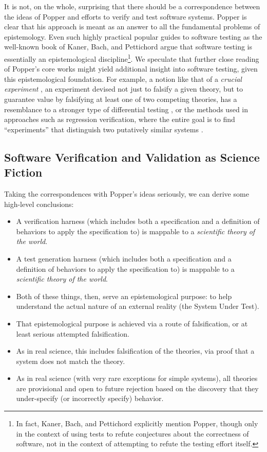 \documentclass{svjour3}
\begin{document}
It is not, on the whole, surprising that there should be a
correspondence between the ideas of Popper and efforts to verify
and test software systems.  Popper is clear that his approach is meant
as an answer to all the fundamental problems of epistemology.  Even
such highly practical popular guides to software testing as the
well-known book of Kaner, Bach, and Pettichord \cite{kaner} argue that
software testing is essentially an epistemological
discipline\footnote{In fact, Kaner, Bach, and Pettichord explicitly
  mention Popper, though only in the context of using tests to refute
  conjectures about the correctness of software, not in the context of
  attempting to refute the testing effort itself.}.  We speculate that
further close reading of Popper's core works might yield additional
insight into software testing, given this epistemological foundation.
For example, a notion like that of a \emph{crucial experiment}
\cite{Popper}, an experiment
devised not just to falsify a given theory, but to guarantee value by
falsifying at least one of two competing theories, has a resemblance
to a stronger type of differential testing \cite{Differential}, or the
methods used in approaches such as regression verification, where the
entire goal is to find ``experiments'' that distinguish two putatively
similar systems \cite{strichman2008regression}.

\subsection{Software Verification and Validation as Science Fiction}

Taking the correspondences with Popper's ideas seriously, we can derive
some high-level conclusions:

\begin{itemize}
\item A verification harness (which includes both a specification and a
  definition of behaviors to apply the specification to) is mappable
 to a \emph{scientific theory of the world}.
\item A test generation harness (which includes both a specification and a
  definition of behaviors to apply the specification to) is mappable
 to a \emph{scientific theory of the world}.
\item Both of these things, then, serve an epistemological purpose:
  to help understand the actual nature of an external reality (the
  System Under Test).
\item That epistemological purpose is achieved via a route of
  falsification, or at least serious attempted falsification.
\item As in real science, this includes falsification of the theories,
  via proof that a system does not match the theory.
\item As in real science (with very rare exceptions for simple
  systems), all theories are provisional and open to future rejection
  based on the discovery that they under-specify (or incorrectly
  specify) behavior.
\end{itemize}
\end{document}

